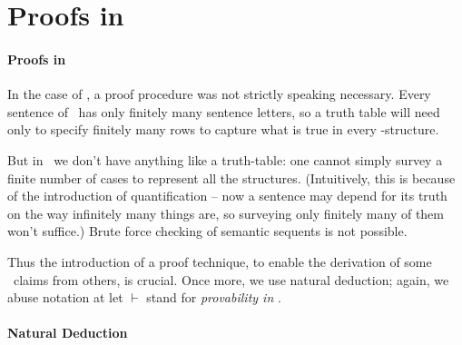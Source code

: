 

\section{Proofs in \ltwo}
\paragraph{Proofs in \ltwo}

In the case of \lone, a proof procedure was not strictly speaking necessary. Every sentence of \lone\ has only finitely many sentence letters, so a truth table will need only to specify finitely many rows to capture what is true in every \lone-structure.

But in \ltwo\ we don't have anything like a truth-table: one cannot simply survey a finite number of cases to represent all the structures. (Intuitively, this is because of the introduction of quantification – now a sentence may depend for its truth on the way infinitely many things are, so surveying only finitely many of them won't suffice.) Brute force checking of semantic sequents is not possible. 

Thus the introduction of a proof technique, to enable the derivation of some \ltwo\ claims from others, is crucial. Once more, we use natural deduction; again, we abuse notation at let $\vdash$ stand for \emph{provability in \ltwo}.

\paragraph{Natural Deduction}

